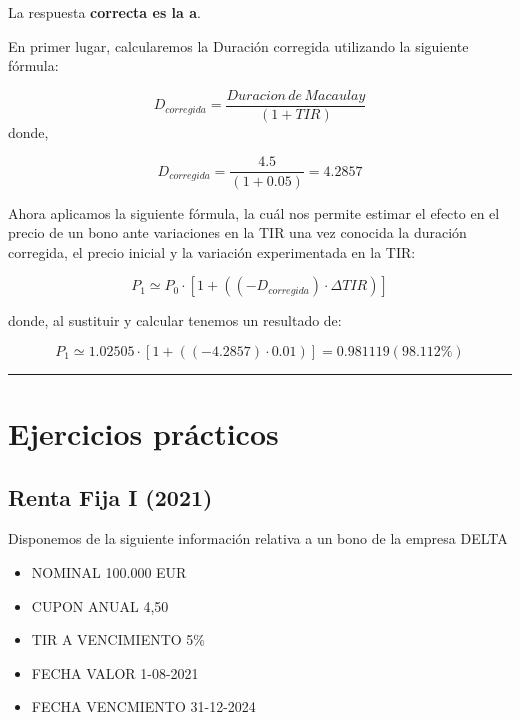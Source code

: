 \documentclass[
  letterpaper,
  DIV=11,
  numbers=noendperiod]{scrartcl}
\providecommand{\tightlist}{%
  \setlength{\itemsep}{0pt}\setlength{\parskip}{0pt}}\usepackage{longtable,booktabs,array}
\begin{document}
\begin{tcolorbox}[enhanced jigsaw, colframe=quarto-callout-note-color-frame, opacityback=0, colback=white, leftrule=.75mm, left=2mm, breakable, arc=.35mm, rightrule=.15mm, toprule=.15mm, bottomrule=.15mm]
\begin{minipage}[t]{5.5mm}
\textcolor{quarto-callout-note-color}{\faInfo}
\end{minipage}%
\begin{minipage}[t]{\textwidth - 5.5mm}

La respuesta \textbf{correcta es la a}.

En primer lugar, calcularemos la Duración corregida utilizando la
siguiente fórmula:

\[D_{corregida}=\frac{Duracion\,de\, Macaulay}{\left(1+TIR\right)}\]
donde,

\[D_{corregida}=\frac{4.5}{(1+0.05)}=4.2857\]

Ahora aplicamos la siguiente fórmula, la cuál nos permite estimar el
efecto en el precio de un bono ante variaciones en la TIR una vez
conocida la duración corregida, el precio inicial y la variación
experimentada en la TIR:

\[P_1\simeq P_0\cdot\left[1+((-D_{corregida})\cdot\Delta TIR)\right]\]

donde, al sustituir y calcular tenemos un resultado de:

\[P_1\simeq 1.02505\cdot\left[1+((-4.2857)\cdot 0.01)\right]=0.981119(98.112\%)\]

\end{minipage}%
\end{tcolorbox}

\begin{center}\rule{0.5\linewidth}{0.5pt}\end{center}

\hypertarget{ejercicios-pruxe1cticos}{%
\section{Ejercicios prácticos}\label{ejercicios-pruxe1cticos}}

\hypertarget{renta-fija-i-2021}{%
\subsection{Renta Fija I (2021)}\label{renta-fija-i-2021}}

Disponemos de la siguiente información relativa a un bono de la empresa
DELTA

\begin{itemize}
\tightlist
\item
  NOMINAL 100.000 EUR
\item
  CUPON ANUAL 4,50
\item
  TIR A VENCIMIENTO 5\%
\item
  FECHA VALOR 1-08-2021
\item
  FECHA VENCMIENTO 31-12-2024
\end{itemize}
\end{document}
